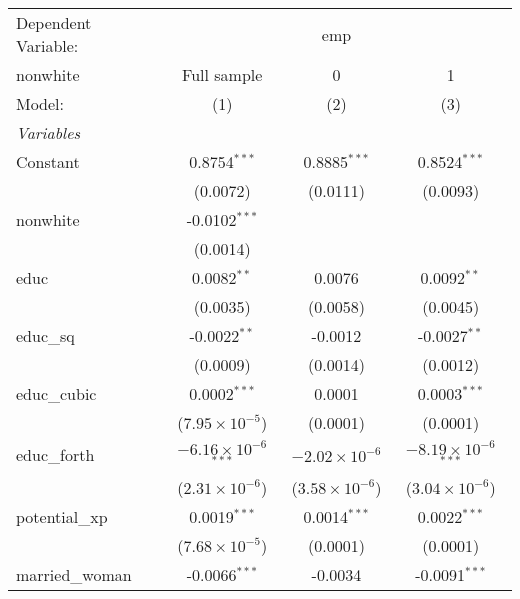 
\begingroup
\centering
\begin{tabular}{lccc}
   \tabularnewline \midrule \midrule
   Dependent Variable: & \multicolumn{3}{c}{emp}\\
   nonwhite        & Full sample                    & 0                       & 1 \\   
   Model:          & (1)                            & (2)                     & (3)\\  
   \midrule
   \emph{Variables}\\
   Constant        & 0.8754$^{***}$                 & 0.8885$^{***}$          & 0.8524$^{***}$\\   
                   & (0.0072)                       & (0.0111)                & (0.0093)\\   
   nonwhite        & -0.0102$^{***}$                &                         &   \\   
                   & (0.0014)                       &                         &   \\   
   educ            & 0.0082$^{**}$                  & 0.0076                  & 0.0092$^{**}$\\   
                   & (0.0035)                       & (0.0058)                & (0.0045)\\   
   educ\_sq        & -0.0022$^{**}$                 & -0.0012                 & -0.0027$^{**}$\\   
                   & (0.0009)                       & (0.0014)                & (0.0012)\\   
   educ\_cubic     & 0.0002$^{***}$                 & 0.0001                  & 0.0003$^{***}$\\   
                   & ($7.95\times 10^{-5}$)         & (0.0001)                & (0.0001)\\   
   educ\_forth     & $-6.16\times 10^{-6}$$^{***}$  & $-2.02\times 10^{-6}$   & $-8.19\times 10^{-6}$$^{***}$\\    
                   & ($2.31\times 10^{-6}$)         & ($3.58\times 10^{-6}$)  & ($3.04\times 10^{-6}$)\\    
   potential\_xp   & 0.0019$^{***}$                 & 0.0014$^{***}$          & 0.0022$^{***}$\\   
                   & ($7.68\times 10^{-5}$)         & (0.0001)                & (0.0001)\\   
   married\_woman  & -0.0066$^{***}$                & -0.0034                 & -0.0091$^{***}$\\   

\end{tabular}
